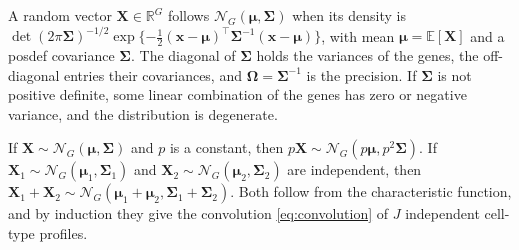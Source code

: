 \begin{definition}
  \label{def:multivariate-gaussian}
  A random vector \(\boldsymbol{X}\in\mathbb{R}^{G}\) follows \(\mathcal{N}_{G}(\boldsymbol{\mu},\boldsymbol{\Sigma})\) when its density is
  \(\det(2\pi\boldsymbol{\Sigma})^{-1/2}\exp\{-\tfrac12(\boldsymbol{x}-\boldsymbol{\mu})^{\top}\boldsymbol{\Sigma}^{-1}(\boldsymbol{x}-\boldsymbol{\mu})\}\), with mean
  \(\boldsymbol{\mu}=\mathbb{E}[\boldsymbol{X}]\) and a \gls{posdef} covariance \(\boldsymbol{\Sigma}\).
  The diagonal of \(\boldsymbol{\Sigma}\) holds the variances of the genes, the off-diagonal entries their
  covariances, and \(\boldsymbol{\Omega}=\boldsymbol{\Sigma}^{-1}\) is the \gls{precision}.
  If \(\boldsymbol{\Sigma}\) is not positive definite, some linear combination of the genes has zero or
  negative variance, and the distribution is degenerate.
\end{definition}

\begin{remark}
  \label{pr:multivariate-affine-transformation}
  If \(\boldsymbol{X}\sim\mathcal{N}_{G}(\boldsymbol{\mu},\boldsymbol{\Sigma})\) and \(p\) is a constant, then
  \(p\boldsymbol{X}\sim\mathcal{N}_{G}(p\boldsymbol{\mu},p^{2}\boldsymbol{\Sigma})\).
  If \(\boldsymbol{X}_{1}\sim\mathcal{N}_{G}(\boldsymbol{\mu}_{1},\boldsymbol{\Sigma}_{1})\) and \(\boldsymbol{X}_{2}\sim\mathcal{N}_{G}(\boldsymbol{\mu}_{2},\boldsymbol{\Sigma}_{2})\) are
  independent, then \(\boldsymbol{X}_{1}+\boldsymbol{X}_{2}\sim\mathcal{N}_{G}(\boldsymbol{\mu}_{1}+\boldsymbol{\mu}_{2},\boldsymbol{\Sigma}_{1}+\boldsymbol{\Sigma}_{2})\).
  Both follow from the characteristic function, and by induction they give the
  \gls{convolution} \eqref{eq:convolution} of \(J\) independent cell-type profiles.
\end{remark}

